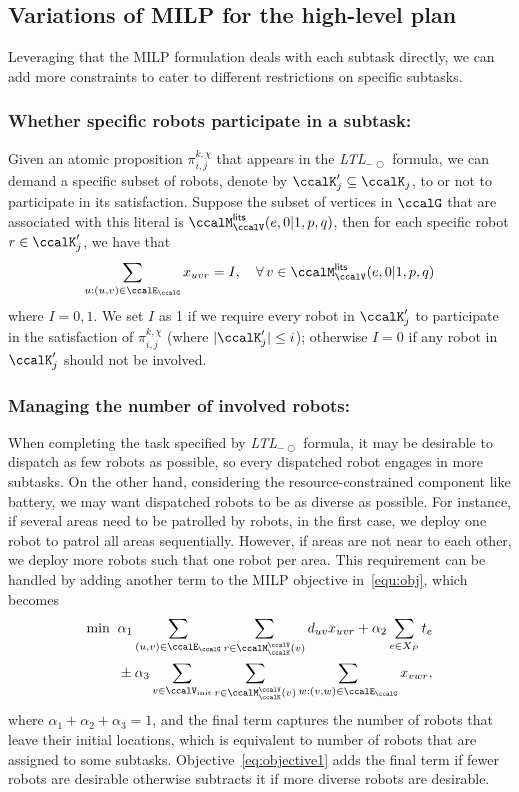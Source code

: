 \documentclass[Afour,sageh,times]{sagej}
\newcommand{\ltl}{ {\it LTL}$_{-\bigcirc}$ }
\renewcommand{\ap}[3]{\mathcal{\pi}_{{#1},{#2}}^{#3}}
\begin{document}
{\subsection{Variations of MILP for the high-level plan}\label{sec:extension_milp}
Leveraging that the MILP formulation deals with each subtask directly, we can add more constraints to cater to different restrictions on specific subtasks.
\subsubsection{Whether specific robots participate in a subtask:}
Given an atomic proposition $\ap{i}{j}{k,\chi}$ that appears in the \ltl formula, we can demand  a specific subset of robots, denote by  ${\ccalK}'_j \subseteq \ccalK_j$,  to or not to participate in its satisfaction. Suppose the subset of vertices  in $\ccalG$ that are associated with this literal is $\ccalM_{\ccalV}^\mathsf{lits} (e, 0|1, p, q)$,  then for each specific robot $r \in \ccalK'_j$, we have that
\begin{align}
  \sum_{u:(u,v) \in \ccalE_\ccalG} x_{uvr} = I, \quad  \forall \, v \in \ccalM_{\ccalV}^\mathsf{lits} (e, 0|1, p, q)
\end{align}
where $I=0,1$. We set $I$ as 1 if we require every robot in $\ccalK'_j$ to participate in the satisfaction of $\ap{i}{j}{k,\chi}$ (where $|\ccalK'_j|\leq i$); otherwise $I=0$ if any robot in $\ccalK'_j$ should not be involved. %
\subsubsection{Managing the number of involved robots:}
When completing the task specified by \ltl formula, it may be desirable to dispatch as few robots as possible, so  every dispatched robot engages in more subtasks. On the other hand, considering the resource-constrained component like battery,  we may want dispatched robots to be  as diverse as possible. For instance, if several areas need to be patrolled by robots, in the first  case, we deploy one robot to patrol all areas sequentially. However, if areas are not near to each other, we deploy more robots such that one robot per area. This requirement can be handled by adding another term to the MILP objective in~\eqref{equ:obj}, which becomes
\begin{align}\label{eq:objective1}
\min \; \; &  \alpha_1 \sum_{(u,v)\in \ccalE_\ccalG}  \sum_{r \in \ccalM^\ccalV_{\ccalK}(v)} d_{uv} x_{uvr} +  \alpha_2  \sum_{e\in X_P} t_e  \nonumber \\ & \pm  \alpha_3 \sum_{v\in \ccalV_{\text{init}}} \sum_{r \in \ccalM_{\ccalK}^\ccalV(v)} \sum_{w:(v,w)\in \ccalE_\ccalG} x_{vwr},
\end{align}
where $\alpha_1 + \alpha_2 + \alpha_3=1$, and the final term  captures the number of robots that leave their initial locations, which is equivalent to  number of robots that are assigned to some subtasks. Objective~\eqref{eq:objective1} adds the final term if fewer robots are desirable otherwise subtracts it if more diverse robots are desirable.

}
\end{document}
